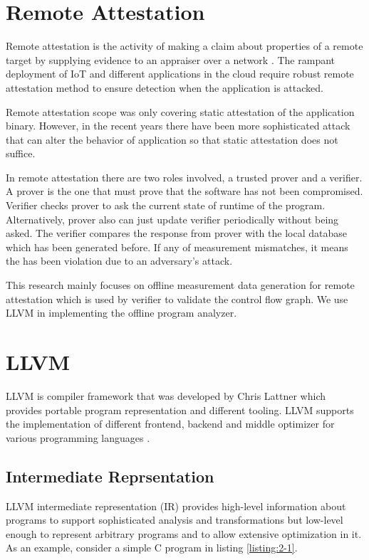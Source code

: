 \section{Remote Attestation}
Remote attestation is the activity of making a claim about properties of a remote target by supplying evidence to an appraiser over a network \cite{cokerPrinciplesRemoteAttestation2011a}. The rampant deployment of IoT and different applications in the cloud require robust remote attestation method to ensure detection when the application is attacked.

Remote attestation scope was only covering static attestation of the application binary. However, in the recent years there have been more sophisticated attack that can alter the behavior of application so that static attestation does not suffice. 

In remote attestation there are two roles involved, a trusted prover and a verifier. A prover is the one that must prove that the software has not been compromised. Verifier checks prover to ask the current state of runtime of the program. Alternatively, prover also can just update verifier periodically without being asked. The verifier compares the response from prover with the local database which has been generated before. If any of measurement mismatches, it means the has been violation due to an adversary's attack.

This research mainly focuses on offline measurement data generation for remote attestation which is used by verifier to validate the control flow graph. We use LLVM in implementing the offline program analyzer.

\section{LLVM}

LLVM is compiler framework that was developed by Chris Lattner which provides portable program representation and different tooling. LLVM supports the implementation of different frontend, backend and middle optimizer for various programming languages \cite{lattnerLLVMCompilationFramework2004a}. 

\subsection{Intermediate Reprsentation}

LLVM intermediate representation (IR) provides high-level information about programs to support sophisticated analysis and transformations but low-level enough to represent arbitrary programs and to allow extensive optimization in it. As an example, consider a simple C program in listing \ref{listing:2-1}.

